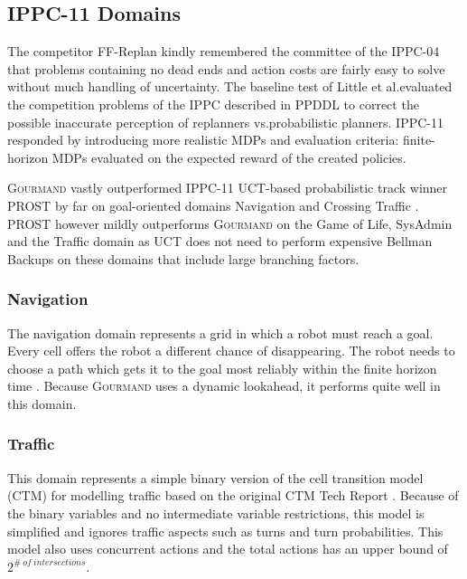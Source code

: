 \documentclass[runningheads,a4paper]{llncs}
\begin{document}
\subsection{IPPC-11 Domains}

The competitor FF-Replan \cite{FFReplan} kindly remembered the committee of the IPPC-04 that problems containing no dead ends and action costs are fairly easy to solve without much handling of uncertainty. The baseline test of Little et al.\@ evaluated the competition problems of the IPPC described in PPDDL to correct the possible inaccurate perception of replanners vs.\@ probabilistic planners. IPPC-11 responded by introducing more realistic MDPs and evaluation criteria: finite-horizon MDPs evaluated on the expected reward of the created policies.

\textsc{Gourmand} vastly outperformed IPPC-11 UCT-based probabilistic track winner PROST by far on goal-oriented domains Navigation and Crossing Traffic \cite{kolobov2012gourmand}. PROST however mildly outperforms \textsc{Gourmand} on the Game of Life, SysAdmin and the Traffic domain as UCT does not need to perform expensive Bellman Backups on these domains that include large branching factors.

\subsubsection{Navigation}

The navigation domain represents a grid in which a robot must reach a goal. Every cell offers the robot a different chance of disappearing. The robot needs to choose a path which gets it to the goal most reliably within the finite horizon time \cite{sanner2011navigation}. Because \textsc{Gourmand} uses a dynamic lookahead, it performs quite well in this domain.


\subsubsection{Traffic}
This domain represents a simple binary version of the cell transition model (CTM) for modelling traffic based on the original CTM Tech Report \cite{sanner2011traffic}. Because of the binary variables and no intermediate variable restrictions, this model is simplified and ignores traffic aspects such as turns and turn probabilities. This model also uses concurrent actions and the total actions has an upper bound of $2^{\#~of~intersections}$.
\end{document}
